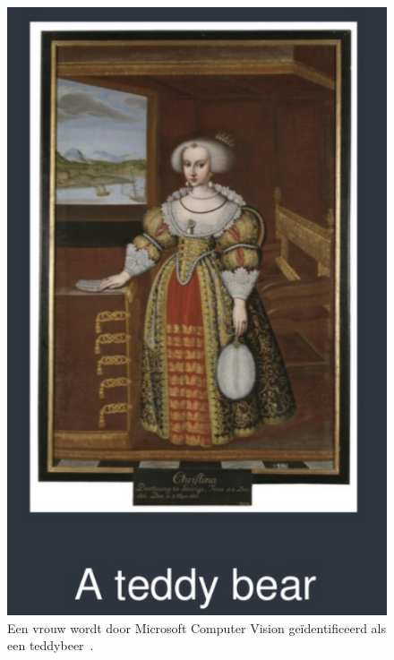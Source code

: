 \documentclass[fleqn,10pt]{voorstel}
\begin{document}
\begin{itemize}
	\begin{figure}[h]
		\caption{Een vrouw wordt door  Microsoft Computer Vision geïdentificeerd als een teddybeer~\autocite{Roddis2018}.}
		\centering
		\includegraphics[width=\linewidth]{pictures/roddis_grappig_1}
	\end{figure}


\end{itemize}
\end{document}
